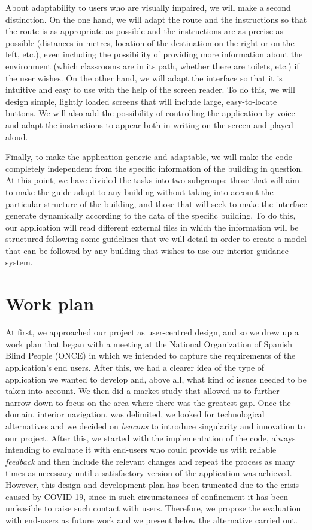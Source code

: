 About adaptability to users who are visually impaired, we will make a second distinction. On the one hand, we will adapt the route and the instructions so that the route is as appropriate as possible and the instructions are as precise as possible (distances in metres, location of the destination on the right or on the left, etc.), even including the possibility of providing more information about the environment (which classrooms are in its path, whether there are toilets, etc.) if the user wishes. On the other hand, we will adapt the interface so that it is intuitive and easy to use with the help of the screen reader. To do this, we will design simple, lightly loaded screens that will include large, easy-to-locate buttons. We will also add the possibility of controlling the application by voice and adapt the instructions to appear both in writing on the screen and played aloud.

Finally, to make the application generic and adaptable, we will make the code completely independent from the specific information of the building in question. At this point, we have divided the tasks into two subgroups: those that will aim to make the guide adapt to any building without taking into account the particular structure of the building, and those that will seek to make the interface generate dynamically according to the data of the specific building. To do this, our application will read different external files in which the information will be structured following some guidelines that we will detail in order to create a model that can be followed by any building that wishes to use our interior guidance system.

\section{Work plan}
\label{sec:workPlan}


At first, we approached our project as user-centred design, and so we drew up a work plan that began with a meeting at the National Organization of Spanish Blind People (ONCE) in which we intended to capture the requirements of the application's end users. After this, we had a clearer idea of the type of application we wanted to develop and, above all, what kind of issues needed to be taken into account. We then did a market study that allowed us to further narrow down to focus on the area where there was the greatest gap. Once the domain, interior navigation, was delimited, we looked for technological alternatives and we decided on \textit{beacons} to introduce singularity and innovation to our project. After this, we started with the implementation of the code, always intending to evaluate it with end-users who could provide us with reliable \textit{feedback} and then include the relevant changes and repeat the process as many times as necessary until a satisfactory version of the application was achieved. However, this design and development plan has been truncated due to the crisis caused by COVID-19, since in such circumstances of confinement it has been unfeasible to raise such contact with users. Therefore, we propose the evaluation with end-users as future work and we present below the alternative carried out.

